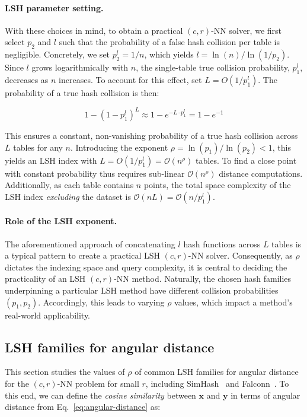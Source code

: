 \documentclass{article}
\newcommand{\bx}{\mathbf{x}}
\newcommand{\by}{\mathbf{y}}
\newcommand{\bigO}{\mathcal{O}}
\newcommand{\crNN}{$(c, r)$-NN\xspace}
\begin{document}
\paragraph{LSH parameter setting.}
With these choices in mind, to obtain a practical \crNN solver, we first select $p_2$ and $l$ such that the probability of a false hash collision per table is negligible. Concretely, we set $p_2^l = 1/n$, which yields $l = \ln(n) / \ln(1/p_2)$. Since $l$ grows logarithmically with $n$, the single-table true collision probability, $p_1^l$, decreases as $n$ increases. To account for this effect, set $L = O(1/p_1^l)$. The probability of a true hash collision is then:

\[
1-(1-p^l_1)^L \approx 1 - e^{- L \cdot p^l_1} = 1 - e^{-1}
\]

This ensures a constant, non-vanishing probability of a true hash collision across $L$ tables for any $n$. Introducing the exponent $\rho = \ln(p_1)/\ln(p_2) < 1$, this yields an LSH index with $L = O(1/p_1^l) = \bigO(n^\rho)$ tables. To find a close point with constant probability thus requires sub-linear $\bigO(n^\rho)$ distance computations. Additionally, as each table contains $n$ points, the total space complexity of the LSH index \emph{excluding} the dataset is $\bigO(nL) = \bigO(n/p_1^l)$.

\paragraph{Role of the LSH exponent.}

The aforementioned approach of concatenating $l$ hash functions across $L$ tables is a typical pattern to create a practical LSH \crNN solver. Consequently, as $\rho$ dictates the indexing space and query complexity, it is central to deciding the practicality of an LSH \crNN method. Naturally, the chosen hash families underpinning a particular LSH method have different collision probabilities $(p_1, p_2)$. Accordingly, this leads to varying $\rho$ values, which impact a method's real-world applicability.

\subsection{LSH families for angular distance}

This section studies the values of $\rho$ of common LSH families for angular distance for the \crNN problem for small $r$, including SimHash~\cite{charikar2002similarity} and Falconn~\cite{andoni2015practical}. To this end, we can define the \emph{cosine similarity} between $\bx$ and $\by$ in terms of angular distance from Eq.~\ref{eq:angular-distance} as:
\end{document}
